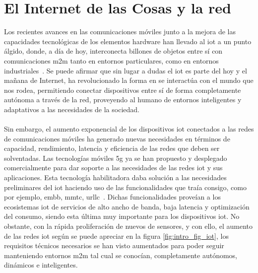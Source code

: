 \section{El Internet de las Cosas y la red }
\label{sec:6gIoT}

Los recientes avances en las comunicaciones móviles junto a la mejora de las capacidades tecnológicas de los elementos hardware han llevado al \gls{iot} a un punto álgido, donde, a día de hoy, interconecta billones de objetos entre sí con comunicaciones \gls{m2m} tanto en entornos particulares, como en entornos industriales~\cite{Balaji2019}. Se puede afirmar que sin lugar a dudas el \gls{iot} es parte del hoy y el mañana de Internet, ha revolucionado la forma en se interactúa con el mundo que nos rodea, permitiendo conectar dispositivos entre sí de forma completamente autónoma a través de la red, proveyendo al humano de entornos inteligentes y adaptativos a las necesidades de la sociedad.\\
\\
Sin embargo, el aumento exponencial de los dispositivos \gls{iot} conectados a las redes de comunicaciones móviles ha generado nuevas necesidades en términos de capacidad, rendimiento, latencia y eficiencia de las redes que deben ser solventadas. Las tecnologías móviles \gls{5g} ya se han propuesto y desplegado comercialmente para dar soporte a las necesidades de las redes \gls{iot} y sus aplicaciones. Esta tecnología habilitadora daba solución a las necesidades preliminares del \gls{iot} haciendo uso de las funcionalidades que traía consigo, como por ejemplo, \gls{embb}, \gls{mmtc}, \gls{urllc}~\cite{Li2018}. Dichas funcionalidades proveían a los ecosistemas \gls{iot} de servicios de alto ancho de banda, baja latencia y optimización del consumo, siendo esta última muy importante para los dispositivos \gls{iot}. No obstante, con la rápida proliferación de nuevos de sensores, y con ello, el aumento de las redes \gls{iot} según se puede apreciar en la figura \ref{fig:intro_fig_iot}, los requisitos técnicos necesarios se han visto aumentados para poder seguir manteniendo entornos \gls{m2m} tal cual se conocían, completamente autónomos, dinámicos e inteligentes.


